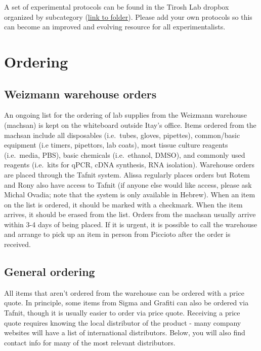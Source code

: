 \documentclass[]{book}
\begin{document}
A set of experimental protocols can be found in the Tirosh Lab dropbox
organized by subcategory
(\href{https://www.dropbox.com/sh/javjoi26i5k5f6t/AADAX4RgSZUFuBwtS6TRE3wua?dl=0}{link
to folder}). Please add your own protocols so this can become an
improved and evolving resource for all experimentalists.

\chapter{Ordering}\label{ordering}

\section{Weizmann warehouse orders}\label{weizmann-warehouse-orders}

An ongoing list for the ordering of lab supplies from the Weizmann
warehouse (machsan) is kept on the whiteboard outside Itay's office.
Items ordered from the machsan include all disposables (i.e.~tubes,
gloves, pipettes), common/basic equipment (i.e timers, pipettors, lab
coats), most tissue culture reagents (i.e.~media, PBS), basic chemicals
(i.e.~ethanol, DMSO), and commonly used reagents (i.e.~kits for qPCR,
cDNA synthesis, RNA isolation). Warehouse orders are placed through the
Tafnit system. Alissa regularly places orders but Rotem and Rony also
have access to Tafnit (if anyone else would like access, please ask
Michal Ovadia; note that the system is only available in Hebrew). When
an item on the list is ordered, it should be marked with a checkmark.
When the item arrives, it should be erased from the list. Orders from
the machsan usually arrive within 3-4 days of being placed. If it is
urgent, it is possible to call the warehouse and arrange to pick up an
item in person from Piccioto after the order is received.

\section{General ordering}\label{general-ordering}

All items that aren't ordered from the warehouse can be ordered with a
price quote. In principle, some items from Sigma and Grafiti can also be
ordered via Tafnit, though it is usually easier to order via price
quote. Receiving a price quote requires knowing the local distributor of
the product - many company websites will have a list of international
distributors. Below, you will also find contact info for many of the
most relevant distributors.
\end{document}
